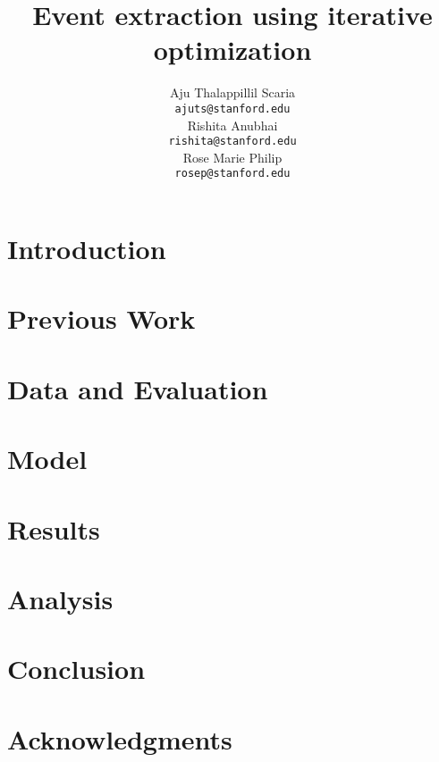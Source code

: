 \documentclass[11pt]{article}
\title{Event extraction using iterative optimization}
\author{
   Aju Thalappillil Scaria \\
  {\tt ajuts@stanford.edu} \\\And
  Rishita Anubhai \\
  {\tt rishita@stanford.edu} \\\And
  Rose Marie Philip \\
  {\tt rosep@stanford.edu} 
\\}
\date{}
\begin{document}
\maketitle
\begin{abstract}

\end{abstract}

\section{Introduction}
\label{sec:introduction}


\section{Previous Work}
\label{sec:previousapproaches}


\section{Data and Evaluation}
\label{sec:data}


\section{Model}
\label{sec:model}

\label{sec:model}

\label{sec:model}

\label{sec:model}

\label{sec:model}


\section{Results}
\label{sec:results}


\section{Analysis}
\label{sec:analysis}


\section{Conclusion}
\label{sec:conclusion}


\section*{Acknowledgments}
\end{document}
